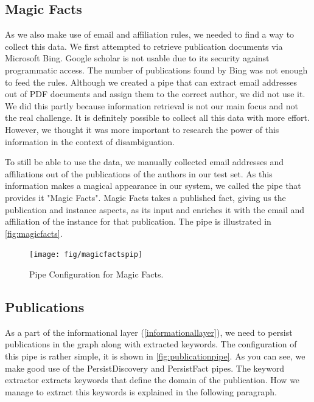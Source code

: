 \subsection{Magic Facts}

As we also make use of email and affiliation rules, we needed to find a way to collect this data. We first attempted to retrieve publication documents via Microsoft Bing. Google scholar is not usable due to its security against programmatic access. The number of publications found by Bing was not enough to feed the rules. Although we created a pipe that can extract email addresses out of PDF documents and assign them to the correct author, we did not use it. We did this partly because information retrieval is not our main focus and not the real challenge. It is definitely possible to collect all this data with more effort. However, we thought it was more important to research the power of this information in the context of disambiguation.

To still be able to use the data, we manually collected email addresses and affiliations out of the publications of the authors in our test set. As this information makes a magical appearance in our system, we called the pipe that provides it "Magic Facts". Magic Facts takes a published fact, giving us the publication and instance aspects, as its input and enriches it with the email and affiliation of the instance for that publication. The pipe is illustrated in \autoref{fig:magicfacts}.

\begin{figure}[htb]
	\centering
		\texttt{[image: fig/magicfactspip]}
	\caption{Pipe Configuration for Magic Facts.}
	\label{fig:magicfacts}
\end{figure}

\subsection{Publications}

As a part of the informational layer (\autoref{informationallayer}), we need to persist publications in the graph along with extracted keywords. The configuration of this pipe is rather simple, it is shown in \autoref{fig:publicationpipe}. As you can see, we make good use of the PersistDiscovery and PersistFact pipes. The keyword extractor extracts keywords that define the domain of the publication. How we manage to extract this keywords is explained in the following paragraph.

